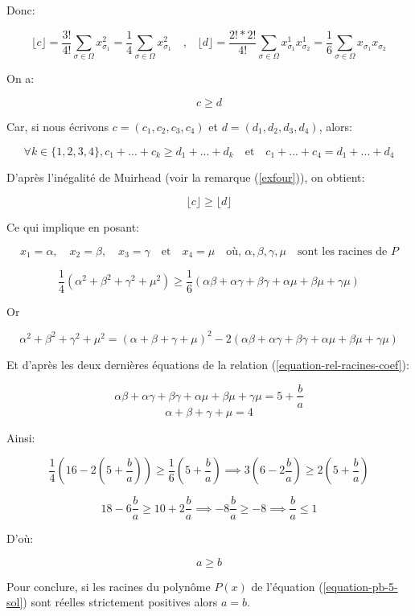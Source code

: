 \documentclass[12pt,a4paper,article]{memoir}
\newcommand{\floor}[1]{\lfloor #1 \rfloor}
\begin{document}
Donc:

\[\floor{c} = \frac{3!}{4!}\sum_{\sigma \in \Omega} x_{\sigma_{1}}^{2} =  \frac{1}{4}\sum_{\sigma \in \Omega} x_{\sigma_{1}}^{2} \quad \textrm{,} \quad \floor{d} = \frac{2!*2!}{4!}\sum_{\sigma \in \Omega} x_{\sigma_{1}}^{1}x_{\sigma_{2}}^{1} = \frac{1}{6}\sum_{\sigma \in \Omega} x_{\sigma_{1}}x_{\sigma_{2}}\]

On a:

\[c \geq d\]

Car, si nous écrivons $c = (c_{1}, c_{2}, c_{3}, c_{4})$ et $d = (d_{1}, d_{2}, d_{3}, d_{4})$, alors:

\[\forall k \in \{1, 2, 3, 4\},  c_{1} + ... + c_{k} \geq d_{1} + ... + d_{k} \quad \textrm{et} \quad c_{1} + ... + c_{4} = d_{1} + ... + d_{4}\]

D'après l'inégalité de Muirhead (voir la remarque (\ref{exfour})), on obtient:

\[\floor{c} \geq \floor{d}\]

Ce qui implique en posant:

\[x_{1} = \alpha, \quad x_{2} = \beta, \quad x_{3} = \gamma \quad \textrm{et} \quad x_{4} = \mu \quad \text{où, } \alpha, \beta, \gamma, \mu \quad \textrm{sont les racines de $P$} \]

\[\frac{1}{4}(\alpha^2 + \beta^2 + \gamma^2 + \mu^2) \geq \frac{1}{6}(\alpha\beta + \alpha\gamma + \beta\gamma + \alpha\mu + \beta\mu + \gamma\mu) \]

Or

\[\alpha^2 + \beta^2 + \gamma^2 + \mu^2 = (\alpha + \beta + \gamma + \mu)^2 - 2(\alpha\beta + \alpha\gamma + \beta\gamma + \alpha\mu + \beta\mu + \gamma\mu)\]

Et d'après les deux dernières équations de la relation (\ref{equation-rel-racines-coef}):

\[\alpha\beta + \alpha\gamma + \beta\gamma + \alpha\mu + \beta\mu + \gamma\mu = 5 + \frac{b}{a}\]
\[\alpha + \beta + \gamma + \mu = 4\]

Ainsi:

\[\frac{1}{4}(16 - 2(5 + \frac{b}{a})) \geq \frac{1}{6}(5 + \frac{b}{a}) \implies 3(6 - 2\frac{b}{a}) \geq 2(5 + \frac{b}{a})\]

\[18 - 6\frac{b}{a} \geq 10 + 2\frac{b}{a} \implies -8\frac{b}{a} \geq -8 \implies \frac{b}{a} \leq 1\]

D'où:

\[a \geq b\]

\bigskip

Pour conclure, si les racines du polynôme $P(x)$ de l'équation (\ref{equation-pb-5-sol}) sont réelles strictement positives alors $a=b$.
\end{document}
